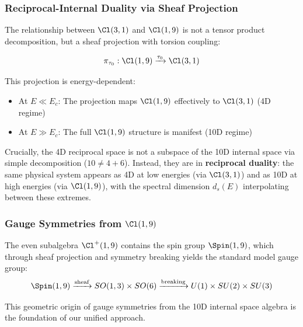 \subsubsection{Reciprocal-Internal Duality via Sheaf Projection}

The relationship between $\Cl(3,1)$ and $\Cl(1,9)$ is not a tensor product decomposition, but a sheaf projection with torsion coupling:

\begin{equation}
    \pi_{\tau_0}: \Cl(1,9) \xrightarrow{\tau_0} \Cl(3,1)
\end{equation}

This projection is energy-dependent:
\begin{itemize}
    \item At $E \ll E_c$: The projection maps $\Cl(1,9)$ effectively to $\Cl(3,1)$ (4D regime)
    \item At $E \gg E_c$: The full $\Cl(1,9)$ structure is manifest (10D regime)
\end{itemize}

\begin{insight}
Crucially, the 4D reciprocal space is not a subspace of the 10D internal space via simple decomposition ($10 \neq 4 + 6$). Instead, they are in \textbf{reciprocal duality}: the same physical system appears as 4D at low energies (via $\Cl(3,1)$) and as 10D at high energies (via $\Cl(1,9)$), with the spectral dimension $d_s(E)$ interpolating between these extremes.
\end{insight}

\subsubsection{Gauge Symmetries from $\Cl(1,9)$}

The even subalgebra $\Cl^+(1,9)$ contains the spin group $\Spin(1,9)$, which through sheaf projection and symmetry breaking yields the standard model gauge group:
\begin{equation}
    \Spin(1,9) \xrightarrow{\text{sheaf}} SO(1,3) \times SO(6) \xrightarrow{\text{breaking}} U(1) \times SU(2) \times SU(3)
\end{equation}

This geometric origin of gauge symmetries from the 10D internal space algebra is the foundation of our unified approach.
